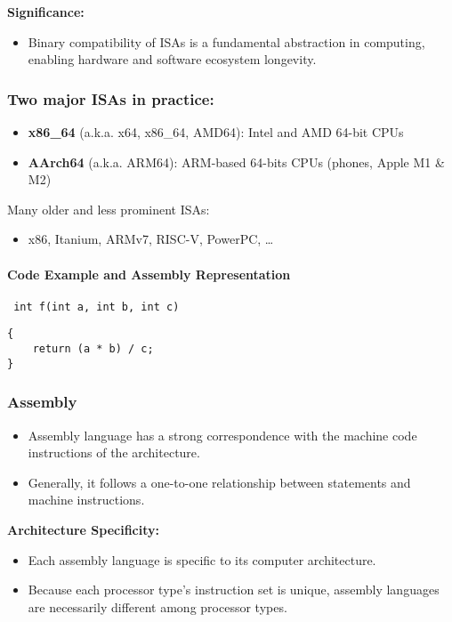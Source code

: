 \documentclass[12pt]{article}
\begin{document}
\textbf{Significance:}
\begin{itemize}
    \item Binary compatibility of ISAs is a fundamental abstraction in computing, enabling hardware and software ecosystem longevity.
\end{itemize}

\subsubsection{Two major ISAs in practice:}
\begin{itemize}
    \item \textbf{x86\_64} (a.k.a. x64, x86\_64, AMD64): Intel\textsuperscript{\textregistered} and AMD\textsuperscript{\textregistered} 64-bit CPUs
    \item \textbf{AArch64} (a.k.a. ARM64): ARM\textsuperscript{\textregistered}-based 64-bits CPUs (phones, Apple M1 \& M2)
\end{itemize}

Many older and less prominent ISAs:
\begin{itemize}
    \item x86, Itanium, ARMv7, RISC-V, PowerPC, \ldots
\end{itemize}

\paragraph{Code Example and Assembly Representation}
\texttt{ int f(int a, int b, int c)}
\begin{verbatim}
{
    return (a * b) / c;
}
\end{verbatim}


\subsubsection{Assembly}
\begin{itemize}
    \item Assembly language has a strong correspondence with the machine code instructions of the architecture.
    \item Generally, it follows a one-to-one relationship between statements and machine instructions.
\end{itemize}

\textbf{Architecture Specificity:}
\begin{itemize}
    \item Each assembly language is specific to its computer architecture.
    \item Because each processor type's instruction set is unique, assembly languages are necessarily different among processor types.
\end{itemize}
\end{document}
